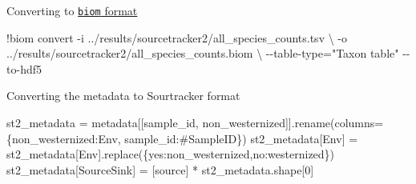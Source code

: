 \documentclass[
  letterpaper,
]{book}
\newenvironment{Shaded}{}{}
\newcommand{\BuiltInTok}[1]{\textcolor[rgb]{0.84,0.23,0.29}{#1}}
\newcommand{\DecValTok}[1]{\textcolor[rgb]{0.00,0.36,0.77}{#1}}
\newcommand{\NormalTok}[1]{\textcolor[rgb]{0.14,0.16,0.18}{#1}}
\newcommand{\OperatorTok}[1]{\textcolor[rgb]{0.14,0.16,0.18}{#1}}
\newcommand{\StringTok}[1]{\textcolor[rgb]{0.01,0.18,0.38}{#1}}
\begin{document}
Converting to \href{https://biom-format.org/}{\texttt{biom} format}

\begin{Shaded}
\begin{Highlighting}[]
\OperatorTok{!}\NormalTok{biom convert }\OperatorTok{{-}}\NormalTok{i ..}\OperatorTok{/}\NormalTok{results}\OperatorTok{/}\NormalTok{sourcetracker2}\OperatorTok{/}\NormalTok{all\_species\_counts.tsv }\OperatorTok{\textbackslash{}}
\OperatorTok{{-}}\NormalTok{o ..}\OperatorTok{/}\NormalTok{results}\OperatorTok{/}\NormalTok{sourcetracker2}\OperatorTok{/}\NormalTok{all\_species\_counts.biom }\OperatorTok{\textbackslash{}}
\OperatorTok{{-}{-}}\NormalTok{table}\OperatorTok{{-}}\BuiltInTok{type}\OperatorTok{=}\StringTok{"Taxon table"} \OperatorTok{{-}{-}}\NormalTok{to}\OperatorTok{{-}}\NormalTok{hdf5}
\end{Highlighting}
\end{Shaded}

Converting the metadata to Sourtracker format

\begin{Shaded}
\begin{Highlighting}[]
\NormalTok{st2\_metadata }\OperatorTok{=}\NormalTok{ metadata[[}\StringTok{\textquotesingle{}sample\_id\textquotesingle{}}\NormalTok{, }\StringTok{\textquotesingle{}non\_westernized\textquotesingle{}}\NormalTok{]].rename(columns}\OperatorTok{=}\NormalTok{\{}\StringTok{\textquotesingle{}non\_westernized\textquotesingle{}}\NormalTok{:}\StringTok{\textquotesingle{}Env\textquotesingle{}}\NormalTok{, }\StringTok{\textquotesingle{}sample\_id\textquotesingle{}}\NormalTok{:}\StringTok{\textquotesingle{}\#SampleID\textquotesingle{}}\NormalTok{\})}
\NormalTok{st2\_metadata[}\StringTok{\textquotesingle{}Env\textquotesingle{}}\NormalTok{] }\OperatorTok{=}\NormalTok{ st2\_metadata[}\StringTok{\textquotesingle{}Env\textquotesingle{}}\NormalTok{].replace(\{}\StringTok{\textquotesingle{}yes\textquotesingle{}}\NormalTok{:}\StringTok{\textquotesingle{}non\_westernized\textquotesingle{}}\NormalTok{,}\StringTok{\textquotesingle{}no\textquotesingle{}}\NormalTok{:}\StringTok{\textquotesingle{}westernized\textquotesingle{}}\NormalTok{\})}
\NormalTok{st2\_metadata[}\StringTok{\textquotesingle{}SourceSink\textquotesingle{}}\NormalTok{] }\OperatorTok{=}\NormalTok{ [}\StringTok{\textquotesingle{}source\textquotesingle{}}\NormalTok{] }\OperatorTok{*}\NormalTok{ st2\_metadata.shape[}\DecValTok{0}\NormalTok{]}
\end{Highlighting}
\end{Shaded}
\end{document}
